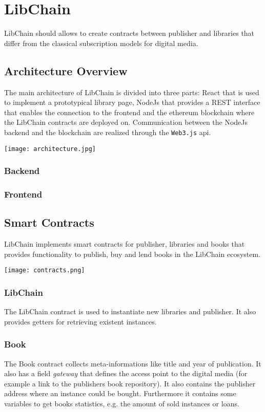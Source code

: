 \chapter{LibChain}
LibChain should allows to create contracts between publisher and libraries that differ from the classical subscription models for digital media. 


\section{Architecture Overview}
The main architecture of LibChain is divided into three parts: React that is used to implement a prototypical library page, NodeJs that provides a REST interface that enables the connection to the frontend and the ethereum blockchain where the LibChain contracts are deployed on. Communication between the NodeJs backend and the blockchain are realized through the \texttt{Web3.js} api.

\vspace{0.3cm}
\texttt{[image: architecture.jpg]}
\subsection{Backend}

\subsection{Frontend}


\section{Smart Contracts}
LibChain implements smart contracts for publisher, libraries and books that provides functionality to publish, buy and lend books in the LibChain ecosystem. 


\vspace{0.3cm}
\texttt{[image: contracts.png]}

\subsection{LibChain}
The LibChain contract is used to instantiate new libraries and publisher. It also provides getters for retrieving existent instances.

\subsection{Book}
The Book contract collects meta-informations like title and year of publication. It also has a field \textit{gateway} that defines the access point to the digital media (for example a link to the publishers book repository). It also contains the publisher address where an instance could be bought. Furthermore it contains some variables to get books statistics, e.g. the amount of sold instances or loans.


